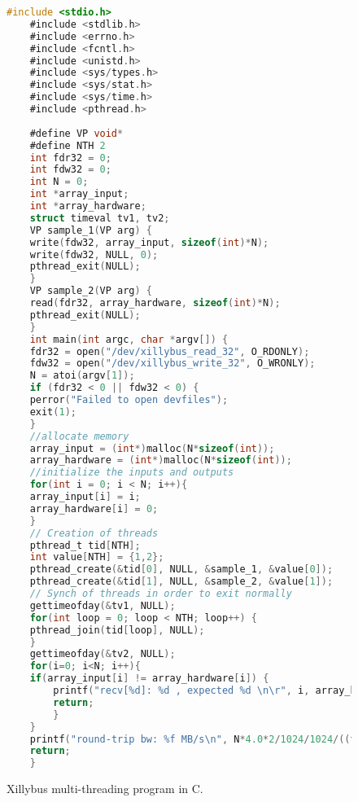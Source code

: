 \begin{figure}
	\centering	
	\begin{lstlisting}[columns=fullflexible, language=C]
	#include <stdio.h>
	#include <stdlib.h>
	#include <errno.h>
	#include <fcntl.h>
	#include <unistd.h>
	#include <sys/types.h>
	#include <sys/stat.h>
	#include <sys/time.h>
	#include <pthread.h>
	
	#define VP void*
	#define NTH 2	
	int fdr32 = 0;
	int fdw32 = 0;
	int N = 0;
	int *array_input;
	int *array_hardware;
	struct timeval tv1, tv2;
	VP sample_1(VP arg) {
	write(fdw32, array_input, sizeof(int)*N);
	write(fdw32, NULL, 0);
	pthread_exit(NULL);
	}
	VP sample_2(VP arg) {
	read(fdr32, array_hardware, sizeof(int)*N);
	pthread_exit(NULL);
	}
	int main(int argc, char *argv[]) {
	fdr32 = open("/dev/xillybus_read_32", O_RDONLY);
	fdw32 = open("/dev/xillybus_write_32", O_WRONLY);
	N = atoi(argv[1]);
	if (fdr32 < 0 || fdw32 < 0) {
	perror("Failed to open devfiles");
	exit(1);
	}
	//allocate memory
	array_input = (int*)malloc(N*sizeof(int));
	array_hardware = (int*)malloc(N*sizeof(int));
	//initialize the inputs and outputs
	for(int i = 0; i < N; i++){
	array_input[i] = i;
	array_hardware[i] = 0;
	}
	// Creation of threads
	pthread_t tid[NTH];
	int value[NTH] = {1,2};
	pthread_create(&tid[0], NULL, &sample_1, &value[0]);
	pthread_create(&tid[1], NULL, &sample_2, &value[1]);
	// Synch of threads in order to exit normally
	gettimeofday(&tv1, NULL);
	for(int loop = 0; loop < NTH; loop++) {
	pthread_join(tid[loop], NULL);
	}
	gettimeofday(&tv2, NULL);
	for(i=0; i<N; i++){
	if(array_input[i] != array_hardware[i]) {
		printf("recv[%d]: %d , expected %d \n\r", i, array_hardware[i], array_input[i]);
		return;
		}
	}
	printf("round-trip bw: %f MB/s\n", N*4.0*2/1024/1024/((tv2.tv_sec-tv1.tv_sec)+(tv2.tv_usec-tv1.tv_usec)/1000000);
	return;
	}
	\end{lstlisting}
	\caption{Xillybus multi-threading program in C.}
	\label{xillybus_host_program_pthread}
\end{figure}